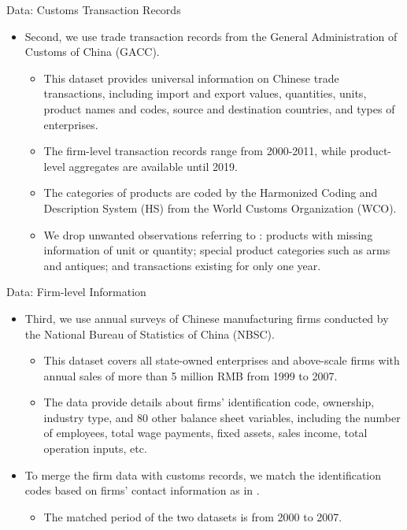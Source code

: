 \documentclass[10pt]{beamer}
\begin{document}
\begin{frame}{Data: Customs Transaction Records}
	\begin{itemize}
		\item Second, we use trade transaction records from the General Administration of Customs of China (GACC).
		\begin{itemize}
			\item This dataset provides universal information on Chinese trade transactions, including import and export values, quantities, units, product names and codes, source and destination countries, and types of enterprises.
                \item The firm-level transaction records range from 2000-2011, while product-level aggregates are available until 2019.
                \item The categories of products are coded by the Harmonized Coding and Description System (HS) from the World Customs Organization (WCO).
                \item We drop unwanted observations referring to \cite{lmx2015}: products with missing information of unit or quantity; special product categories such as arms and antiques; and transactions existing for only one year.
		\end{itemize}		
	\end{itemize}
\end{frame}

\begin{frame}{Data: Firm-level Information}
	\begin{itemize}
		\item Third, we use annual surveys of Chinese manufacturing firms conducted by the National Bureau of Statistics of China (NBSC).
		\begin{itemize}
			\item This dataset covers all state-owned enterprises and above-scale firms with annual sales of more than 5 million RMB from 1999 to 2007.
			\item The data provide details about firms’ identification code, ownership, industry type, and 80 other balance sheet variables, including the number of employees, total wage payments, fixed assets, sales income, total operation inputs, etc.
		\end{itemize}
		\item To merge the firm data with customs records, we match the identification codes based on firms' contact information as in \cite{fan-li-yeaple2015}.
            \begin{itemize}
                \item The matched period of the two datasets is from 2000 to 2007.
            \end{itemize}
	\end{itemize}
\end{frame}
\end{document}
